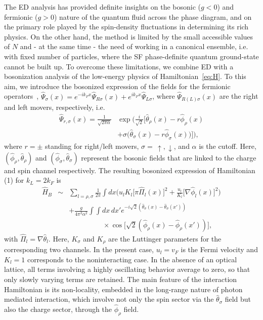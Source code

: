 \documentclass[pra,aps,superscriptaddress,twocolumn]{revtex4}
\begin{document}
The ED analysis has provided definite insights on the bosonic ($g<0$) and fermionic ($g>0$) nature of the quantum fluid across the phase
diagram, and on the primary role played by the spin-density fluctuations in determining its rich physics. On the other hand, the method is limited by the small accessible
values of $N$ and - at the same time - the need of working in a canonical ensemble, i.e. with fixed number of particles, where the SF phase-definite quantum
ground-state cannot be built up. To overcome these limitations, we combine ED with a bosonization analysis of the low-energy physics of
Hamiltonian~\eqref{eq:H}. To this aim, we introduce
the bosonized expression of the fields for the fermionic operators~\cite{Giamarchi},
$\hat \Psi_\sigma(x) = e^{-ik_Fx} \hat \Psi_{R\sigma}(x) + e^{ik_Fx} \hat \Psi_{L\sigma}$,
where $\hat \Psi_{R(L)\sigma}(x)$ are the right and left movers,
respectively, i.e.
\begin{align}
  \hat \Psi_{r,\sigma}(x) = \frac{1}{\sqrt{2\pi\alpha}} &
  \exp \Big( \frac{i}{\sqrt{2}} \Big[ \hat \theta_\rho(x)-r \hat \phi_\rho(x) \nonumber \\
    & + \sigma \big( \hat \theta_\sigma(x) - r \hat \phi_\sigma(x) \big) \Big] \Big) ,
\end{align}
where  $r=\pm$ standing for right/left movers, $\sigma = \, \uparrow, \downarrow$, and $\alpha$ is the cutoff.
Here, $(\hat \phi_\rho, \hat \theta_\rho)$ and $(\hat \phi_\sigma, \hat \theta_\sigma)$ represent
the bosonic fields that are linked to the charge and spin channel respectively.
The resulting bosonized expression of Hamiltonian (1) for $k_L=2k_F$ is
\begin{eqnarray}
  \hat H_{B} & \sim & \sum_{l=\rho,\sigma}\frac{1}{2\pi}\int dx \Big( u_lK_l \big[ \pi \hat \Pi_l(x) \big]^2+\frac{u_l}{K_l} \big[ \nabla \hat \phi_l(x) \big]^2 \Big) \nonumber \\
  & & + \frac{g}{4\pi^2\alpha^2} \int \!\! \int dx \, dx'
  e^{-i\sqrt{2}(\hat \theta_\sigma(x) - \hat \theta_\sigma(x'))} \nonumber \\
  && \hspace{2cm} \times \cos \big[\sqrt{2}(\hat \phi_\rho(x) - \hat \phi_\rho(x') ) \big] ,
\end{eqnarray}
with $\hat\Pi_l=\nabla\hat\theta_l$. Here, $K_\sigma$ and $K_\rho$ are the Luttinger parameters for the corresponding two channels.
In the present case, $u_l=v_F$ is the Fermi velocity and $K_l=1$ corresponds to the noninteracting case.
In the absence of an optical lattice, all terms involving a highly oscillating behavior average to zero,
so that only slowly varying terms are retained.
The main feature of the interaction Hamiltonian is its non-locality, embedded in the long-range nature of photon mediated
interaction, which involve not only the spin sector via the $\hat \theta_\sigma$ field but also the charge sector,
through the $\hat \phi_\rho$ field.
\end{document}
